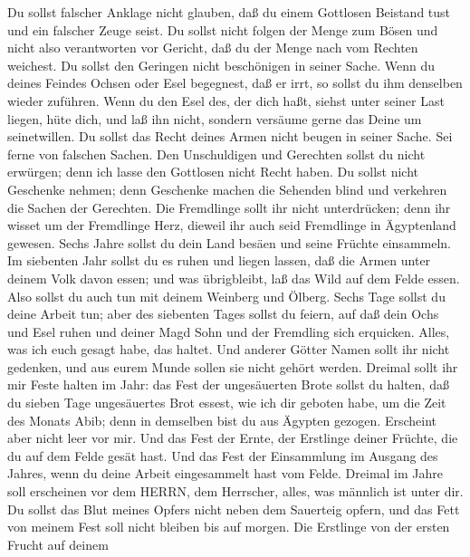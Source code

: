  Du sollst falscher Anklage nicht glauben, daß du einem
Gottlosen Beistand tust und ein falscher Zeuge seist.  Du
sollst nicht folgen der Menge zum Bösen und nicht also verantworten vor
Gericht, daß du der Menge nach vom Rechten weichest.  Du
sollst den Geringen nicht beschönigen in seiner Sache.  Wenn
du deines Feindes Ochsen oder Esel begegnest, daß er irrt, so sollst du
ihm denselben wieder zuführen.  Wenn du den Esel des, der
dich haßt, siehst unter seiner Last liegen, hüte dich, und laß ihn
nicht, sondern versäume gerne das Deine um seinetwillen.  Du
sollst das Recht deines Armen nicht beugen in seiner Sache. 
Sei ferne von falschen Sachen. Den Unschuldigen und Gerechten sollst du
nicht erwürgen; denn ich lasse den Gottlosen nicht Recht haben.
 Du sollst nicht Geschenke nehmen; denn Geschenke machen die
Sehenden blind und verkehren die Sachen der Gerechten.  Die
Fremdlinge sollt ihr nicht unterdrücken; denn ihr wisset um der
Fremdlinge Herz, dieweil ihr auch seid Fremdlinge in Ägyptenland
gewesen.  Sechs Jahre sollst du dein Land besäen und seine
Früchte einsammeln.  Im siebenten Jahr sollst du es ruhen
und liegen lassen, daß die Armen unter deinem Volk davon essen; und was
übrigbleibt, laß das Wild auf dem Felde essen. Also sollst du auch tun
mit deinem Weinberg und Ölberg.  Sechs Tage sollst du deine
Arbeit tun; aber des siebenten Tages sollst du feiern, auf daß dein Ochs
und Esel ruhen und deiner Magd Sohn und der Fremdling sich erquicken.
 Alles, was ich euch gesagt habe, das haltet. Und anderer
Götter Namen sollt ihr nicht gedenken, und aus eurem Munde sollen sie
nicht gehört werden.  Dreimal sollt ihr mir Feste halten im
Jahr:  das Fest der ungesäuerten Brote sollst du halten,
daß du sieben Tage ungesäuertes Brot essest, wie ich dir geboten habe,
um die Zeit des Monats Abib; denn in demselben bist du aus Ägypten
gezogen. Erscheint aber nicht leer vor mir.  Und das Fest
der Ernte, der Erstlinge deiner Früchte, die du auf dem Felde gesät
hast. Und das Fest der Einsammlung im Ausgang des Jahres, wenn du deine
Arbeit eingesammelt hast vom Felde.  Dreimal im Jahre soll
erscheinen vor dem HERRN, dem Herrscher, alles, was männlich ist unter
dir.  Du sollst das Blut meines Opfers nicht neben dem
Sauerteig opfern, und das Fett von meinem Fest soll nicht bleiben bis
auf morgen.  Die Erstlinge von der ersten Frucht auf deinem
